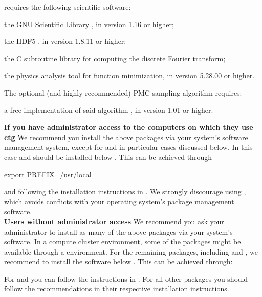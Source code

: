 \ctg requires the following scientific software:
\begin{description}[labelwidth=.15\textwidth]
    \item[\package{GSL}] the GNU Scientific Library \cite{GSL}, in version 1.16 or higher;
    \item[\package{HDF5}] the \gls{HDF5} \cite{HDF5}, in version 1.8.11 or higher;
    \item[\package{FFTW3}] the C subroutine library for computing the discrete Fourier transform;
    \item[\package{Minuit2}] the physics analysis tool for function minimization, in version 5.28.00 or higher.
\end{description}
The optional (and highly recommended) \gls{PMC} sampling algorithm requires:
\begin{description}[labelwidth=.15\textwidth]
    \item[\package{pmclib}] a free implementation of said algorithm \cite{libpmc}, in version 1.01 or higher.
\end{description}

\textbf{If you have administrator access to the computers on which they use ctg}\quad
We recommend you install the above packages via your system's software
management system, except for  and  in particular
cases discussed below. In this case  and  should
be installed below . This can be achieved through
\begin{commandline}
export PREFIX=/usr/local
\end{commandline}
and following the installation instructions in .
We strongly discourage using , which avoids conflicts with
your operating system's package management software.\\

\textbf{Users without administrator access}\quad
We recommend you ask your administrator to install as many of the above packages via your
system's software. In a compute cluster environment, some of the packages might be
available through a  environment. For the remaining packages,
including  and , we recommend to install the software
below . This can be achieved through:
For  and  you can follow the instructions in
. For all other packages you should follow the recommendations
in their respective installation instructions.

